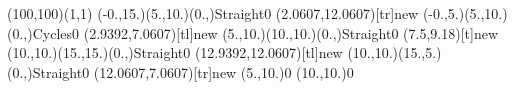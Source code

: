 \documentclass[12pt]{article}
\begin{document}
\thispagestyle{empty}
\begin{feynartspicture}(100,100)(1,1)
\FADiagram{}
\FAProp(-0.,15.)(5.,10.)(0.,){Straight}{0}
\FALabel(2.0607,12.0607)[tr]{new}
\FAProp(-0.,5.)(5.,10.)(0.,){Cycles}{0}
\FALabel(2.9392,7.0607)[tl]{new}
\FAProp(5.,10.)(10.,10.)(0.,){Straight}{0}
\FALabel(7.5,9.18)[t]{new}
\FAProp(10.,10.)(15.,15.)(0.,){Straight}{0}
\FALabel(12.9392,12.0607)[tl]{new}
\FAProp(10.,10.)(15.,5.)(0.,){Straight}{0}
\FALabel(12.0607,7.0607)[tr]{new}
\FAVert(5.,10.){0}
\FAVert(10.,10.){0}

\end{feynartspicture}
\end{document}
